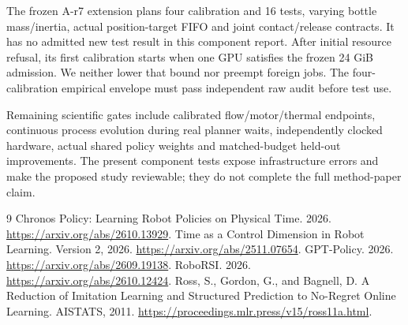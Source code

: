 \documentclass{article}
\begin{document}
The frozen A-r7 extension plans four calibration and 16 tests, varying bottle
mass/inertia, actual position-target FIFO and joint contact/release contracts.
It has no admitted new test result in this component report. After initial
resource refusal, its first calibration starts when one GPU satisfies the
frozen 24 GiB admission. We neither lower that bound nor preempt foreign jobs. The four-calibration
empirical envelope must pass independent raw audit before test use.

Remaining scientific gates include calibrated flow/motor/thermal endpoints,
continuous process evolution during real planner waits, independently clocked
hardware, actual shared policy weights and matched-budget held-out improvements.
The present component tests expose infrastructure errors and make the proposed
study reviewable; they do not complete the full method-paper claim.

\begin{thebibliography}{9}
 Chronos Policy: Learning Robot Policies on Physical Time. 2026. \url{https://arxiv.org/abs/2610.13929}.
 Time as a Control Dimension in Robot Learning. Version 2, 2026. \url{https://arxiv.org/abs/2511.07654}.
 GPT-Policy. 2026. \url{https://arxiv.org/abs/2609.19138}.
 RoboRSI. 2026. \url{https://arxiv.org/abs/2610.12424}.
 Ross, S., Gordon, G., and Bagnell, D. A Reduction of Imitation Learning and Structured Prediction to No-Regret Online Learning. AISTATS, 2011. \url{https://proceedings.mlr.press/v15/ross11a.html}.
\end{thebibliography}
\end{document}
